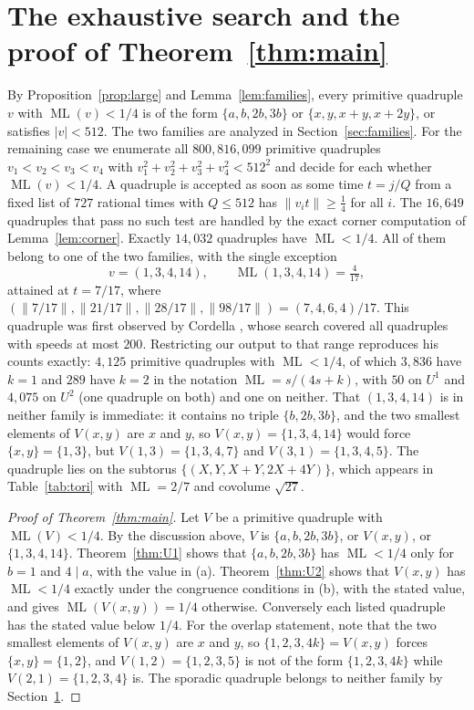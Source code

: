 \documentclass[12pt]{amsart}
\theoremstyle{definition}\newtheorem{definition}[theorem]{Definition}
\theoremstyle{remark}\newtheorem{remark}[theorem]{Remark}
\newcommand{\norm}[1]{\lVert #1\rVert}
\newcommand{\ML}{\operatorname{ML}}
\newcommand{\eucl}[1]{\lvert #1\rvert}
\newcommand{\Uone}{U^{1}}\newcommand{\Utwo}{U^{2}}
\begin{document}
\section{The exhaustive search and the proof of Theorem~\ref{thm:main}}\label{sec:search}
By Proposition~\ref{prop:large} and Lemma~\ref{lem:families}, every primitive quadruple $v$ with $\ML(v)<1/4$ is of the form $\{a,b,2b,3b\}$ or $\{x,y,x+y,x+2y\}$, or satisfies $\eucl v<512$. The two families are analyzed in Section~\ref{sec:families}. For the remaining case we enumerate all $800{,}816{,}099$ primitive quadruples $v_1<v_2<v_3<v_4$ with $v_1^2+v_2^2+v_3^2+v_4^2<512^2$ and decide for each whether $\ML(v)<1/4$. A quadruple is accepted as soon as some time $t=j/Q$ from a fixed list of $727$ rational times with $Q\le 512$ has $\norm{v_it}\ge\frac14$ for all $i$. The $16{,}649$ quadruples that pass no such test are handled by the exact corner computation of Lemma~\ref{lem:corner}. Exactly $14{,}032$ quadruples have $\ML<1/4$. All of them belong to one of the two families, with the single exception
\[
 v=(1,3,4,14),\qquad \ML(1,3,4,14)=\tfrac4{17},
\]
attained at $t=7/17$, where $(\norm{7/17},\norm{21/17},\norm{28/17},\norm{98/17})=(7,4,6,4)/17$. This quadruple was first observed by Cordella \cite[Section~6.3]{Cordella}, whose search covered all quadruples with speeds at most $200$. Restricting our output to that range reproduces his counts exactly: $4{,}125$ primitive quadruples with $\ML<1/4$, of which $3{,}836$ have $k=1$ and $289$ have $k=2$ in the notation $\ML=s/(4s+k)$, with $50$ on $\Uone$ and $4{,}075$ on $\Utwo$ (one quadruple on both) and one on neither. That $(1,3,4,14)$ is in neither family is immediate: it contains no triple $\{b,2b,3b\}$, and the two smallest elements of $V(x,y)$ are $x$ and $y$, so $V(x,y)=\{1,3,4,14\}$ would force $\{x,y\}=\{1,3\}$, but $V(1,3)=\{1,3,4,7\}$ and $V(3,1)=\{1,3,4,5\}$. The quadruple lies on the subtorus $\{(X,Y,X+Y,2X+4Y)\}$, which appears in Table~\ref{tab:tori} with $\ML=2/7$ and covolume $\sqrt{27}$.

\begin{proof}[Proof of Theorem~\ref{thm:main}]
Let $V$ be a primitive quadruple with $\ML(V)<1/4$. By the discussion above, $V$ is $\{a,b,2b,3b\}$, or $V(x,y)$, or $\{1,3,4,14\}$. Theorem~\ref{thm:U1} shows that $\{a,b,2b,3b\}$ has $\ML<1/4$ only for $b=1$ and $4\mid a$, with the value in (a). Theorem~\ref{thm:U2} shows that $V(x,y)$ has $\ML<1/4$ exactly under the congruence conditions in (b), with the stated value, and gives $\ML(V(x,y))=1/4$ otherwise. Conversely each listed quadruple has the stated value below $1/4$. For the overlap statement, note that the two smallest elements of $V(x,y)$ are $x$ and $y$, so $\{1,2,3,4k\}=V(x,y)$ forces $\{x,y\}=\{1,2\}$, and $V(1,2)=\{1,2,3,5\}$ is not of the form $\{1,2,3,4k\}$ while $V(2,1)=\{1,2,3,4\}$ is. The sporadic quadruple belongs to neither family by Section~\ref{sec:search}.
\end{proof}
\end{document}
